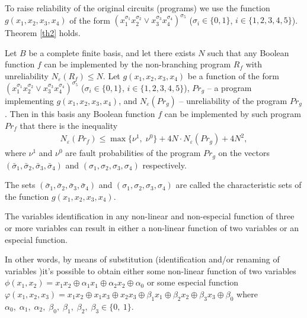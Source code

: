 \documentclass[
11pt,%
tightenlines,%
twoside,%
onecolumn,%
nofloats,%
nobibnotes,%
nofootinbib,%
superscriptaddress,%
noshowpacs,%
centertags]%
{revtex4}
\begin{document}
To raise reliability of the original circuits (programs) we use the
function $g(x_1, x_2, x_3, x_4)$ of the form
$(x_1^{\sigma_1}x_2^{\sigma_2}\vee
x_3^{\sigma_3}x_4^{\sigma_4})^{\sigma_5}$ ($\sigma_i\in \{0, 1\}$,
$i\in \{1, 2, 3, 4, 5\}$). Theorem \ref{th2} holds.

\begin{theorem}\label{th2}\cite{14} Let $B$ be a complete finite basis,
 and let there exists $N$ such that any Boolean function $f$ can be implemented
 by the non-branching program $R_f$  with unreliability $N_\varepsilon(R_f)\leq N$.
 Let $g(x_1, x_2, x_3, x_4)$ be a function of the form $(x_1^{\sigma_1}x_2^{\sigma_2}\vee x_3^{\sigma_3}x_4^{\sigma_4})^{\sigma_5}$ ($\sigma_i\in \{0, 1\}$, $i\in \{1, 2, 3, 4, 5\}$), $Pr_g$ -- a program implementing $g(x_1, x_2, x_3, x_4)$, and $N_\varepsilon(Pr_g)$ -- unreliability of the program $Pr_g$. Then in this basis any Boolean function $f$ can be implemented by such program $Pr_f$
that there is the inequality
\begin{eqnarray}
N_\varepsilon(Pr_f)\leq\max \{\nu^1,\;\nu^0\}+4N\cdot N_\varepsilon(Pr_g)+
4N^2
\label{f1},
\end{eqnarray}
where $\nu^1 $ and $\nu^0 $ are fault probabilities of the program $Pr_g$ on the
vectors $(\bar \sigma_1 ,\bar \sigma_2 ,\bar \sigma_3, \bar \sigma_4)$ and
$(\sigma_1, \sigma_2, \sigma_3, \sigma_4)$ respectively. \end{theorem}

The sets $(\bar \sigma_1 ,\bar \sigma_2 ,\bar \sigma_3, \bar \sigma_4)$ and $(\sigma_1, \sigma_2, \sigma_3, \sigma_4)$  are called the characteristic sets of the function $g(x_1, x_2, x_3, x_4)$.

\begin{lemma}\label{l1}\cite{15} The variables identification in any non-linear
and non-especial function of three or more variables can result in either a non-linear
 function of two variables or an especial function.\end{lemma}

In other words, by means of substitution (identification and/or
renaming of variables \cite{16})\linebreak   it's possible to obtain
either some non-linear function of two variables $\phi (x_1,x_2)=x_1
x_2 \oplus \alpha_1 x_1 \oplus\alpha_2 x_2 \oplus \alpha_0$ or some
especial function $\varphi(x_1,x_2,x_3)=x_1 x_2\oplus x_1 x_3 \oplus
x_2 x_3 \oplus \beta_1 x_1 \oplus \beta_2 x_2 \oplus \beta_3 x_3
\oplus \beta_0$ where
$\alpha_0,\;\alpha_1,\;\alpha_2,\;\beta_0,\;\beta_1,\;\beta_2,\;\beta_3
\in \{0, \ 1\}$.
\end{document}
